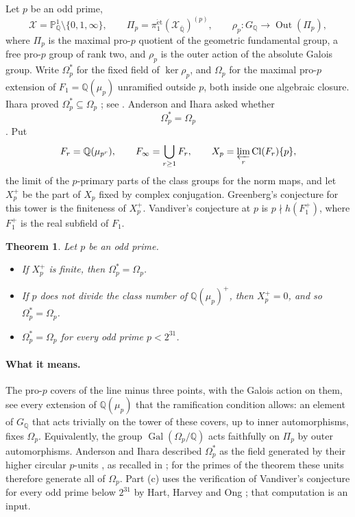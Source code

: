 \documentclass[11pt]{article}
\newtheorem{theorem}{Theorem}[section]
\theoremstyle{definition}
\numberwithin{equation}{section}
\begin{document}
Let $p$ be an odd prime,
\begin{equation}
 \mathcal X=\mathbb P^1_{\mathbb Q}\setminus\{0,1,\infty\},\qquad
 \Pi_p=\pi_1^{\mathrm{\acute et}}(\mathcal X_{\overline{\mathbb Q}})^{(p)},
 \qquad
 \rho_p:G_{\mathbb Q}\longrightarrow\operatorname{Out}(\Pi_p),
\end{equation}
where $\Pi_p$ is the maximal pro-$p$ quotient of the geometric fundamental group, a free pro-$p$ group of rank
two, and $\rho_p$ is the outer action of the absolute Galois group. Write $\Omega_p^*$ for the fixed field of
$\ker\rho_p$, and $\Omega_p$ for the maximal pro-$p$ extension of $F_1=\mathbb Q(\mu_p)$ unramified outside $p$,
both inside one algebraic closure. Ihara proved $\Omega_p^*\subseteq\Omega_p$ \cite{Ihara1986}; see
\cite[p.~1]{Sharifi2002}. Anderson and Ihara asked whether
\[
 \Omega_p^*=\Omega_p
\]
\cite[p.~272, question (a)]{AndersonIhara1988}. Put
\begin{equation}
 F_r=\mathbb Q(\mu_{p^r}),\qquad F_\infty=\bigcup_{r\ge1}F_r,
 \qquad X_p=\varprojlim_r\operatorname{Cl}(F_r)\{p\},
\end{equation}
the limit of the $p$-primary parts of the class groups for the norm maps, and let $X_p^+$ be the part of $X_p$
fixed by complex conjugation. Greenberg's conjecture for this tower is the finiteness of $X_p^+$. Vandiver's
conjecture at $p$ is $p\nmid h(F_1^+)$, where $F_1^+$ is the real subfield of $F_1$.

\begin{theorem}\label{thm:greenberg-kernel}
Let $p$ be an odd prime.
\begin{itemize}
\item[\textup{(a)}] If $X_p^+$ is finite, then $\Omega_p^*=\Omega_p$.
\item[\textup{(b)}] If $p$ does not divide the class number of $\mathbb Q(\mu_p)^+$, then $X_p^+=0$, and so
$\Omega_p^*=\Omega_p$.
\item[\textup{(c)}] $\Omega_p^*=\Omega_p$ for every odd prime $p<2^{31}$.
\end{itemize}
\end{theorem}

\paragraph{What it means.}
The pro-$p$ covers of the line minus three points, with the Galois action on them, see every extension of
$\mathbb Q(\mu_p)$ that the ramification condition allows: an element of $G_{\mathbb Q}$ that acts trivially on
the tower of these covers, up to inner automorphisms, fixes $\Omega_p$. Equivalently, the group
$\operatorname{Gal}(\Omega_p/\mathbb Q)$ acts faithfully on $\Pi_p$ by outer automorphisms. Anderson and Ihara
described $\Omega_p^*$ as the field generated by their higher circular $p$-units \cite[Theorem~2\,(IV)]{AndersonIhara1988},
as recalled in \cite[p.~2]{IshiiKernel2026}; for the
primes of the theorem these units therefore generate all of $\Omega_p$. Part (c) uses the verification of
Vandiver's conjecture for every odd prime below $2^{31}$ by Hart, Harvey and Ong
\cite[Section 1, item (2)]{HartHarveyOng2017}; that computation is an input.
\end{document}
